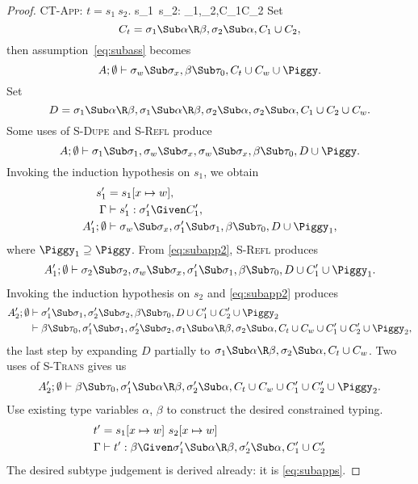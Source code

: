 \documentclass{amsart}
\theoremstyle{definition}
\begin{document}
\begin{proof}
\Case\textsc{CT-App}: $t=s_1~s_2$.
{\Gamma\vdash s_1~s_2:\beta\Given
\sigma_1\Sub\alpha\R\beta,\sigma_2\Sub\alpha,C_1\cup C_2
}
Set
\[
C_t=\sigma_1\Sub\alpha\R\beta,\sigma_2\Sub\alpha,C_1\cup C_2,
\]
then assumption~\eqref{eq:subass} becomes
\[
A;\Exigent\vdash
  \sigma_\Xdef\Sub\sigma_x,
  \beta\Sub\tau_0,
  C_t\cup C_\Xdef\cup\Piggy.
\]
Set
\[
D=
\sigma_1\Sub\alpha\R\beta,
\sigma_1\Sub\alpha\R\beta,
\sigma_2\Sub\alpha,
\sigma_2\Sub\alpha,C_1\cup C_2\cup C_\Xdef.
\]
Some uses of \textsc{S-Dupe} and \textsc{S-Refl} produce
\[
A;\Exigent\vdash
  \sigma_1\Sub\sigma_1,
  \sigma_\Xdef\Sub\sigma_x,\sigma_\Xdef\Sub\sigma_x,
  \beta\Sub\tau_0,
  D\cup\Piggy.
\]
Invoking the induction hypothesis on $s_1$, we obtain
\begin{align}
s_1'&=s_1[x\mapsto \Xdef]\notag,
\\
\Gamma&\vdash s_1' : \sigma_1' \Given C_1',
\label{eq:subapp1}
\\
A_1';\Exigent&\vdash
  \sigma_\Xdef\Sub\sigma_x,
  \sigma_1'\Sub\sigma_1,
  \beta\Sub\tau_0,
  D\cup\Piggy_1,
\label{eq:subapp2}
\end{align}
where $\Piggy_1\supseteq\Piggy$. From \eqref{eq:subapp2},
\textsc{S-Refl} produces
\begin{align}
A_1';\Exigent\vdash
  \sigma_2\Sub\sigma_2,
  \sigma_\Xdef\Sub\sigma_x,
  \sigma_1'\Sub\sigma_1,
  \beta\Sub\tau_0,
  D\cup C_1'\cup\Piggy_1.
\label{eq:subappf}
\end{align}
Invoking the induction hypothesis on $s_2$ and \eqref{eq:subapp2}
produces
\begin{align}
A_2';\Exigent&\vdash
  \sigma_1'\Sub\sigma_1,
  \sigma_2'\Sub\sigma_2,
  \beta\Sub\tau_0,
  D\cup C_1'\cup C_2'\cup\Piggy_2
\notag\\
&\vdash
  \beta\Sub\tau_0,
  \sigma_1'\Sub\sigma_1,
  \sigma_2'\Sub\sigma_2,
  \sigma_1\Sub\alpha\R\beta,\sigma_2\Sub\alpha,
  C_t\cup C_\Xdef\cup C_1'\cup C_2'\cup\Piggy_2,
\notag
\end{align}
the last step by expanding $D$ partially to
$\sigma_1\Sub\alpha\R\beta,\sigma_2\Sub\alpha,C_t\cup C_\Xdef$.
Two uses of \textsc{S-Trans} gives us
\begin{align}
A_2';\Exigent\vdash
  \beta\Sub\tau_0,
  \sigma_1'\Sub\alpha\R\beta,\sigma_2'\Sub\alpha,
  C_t\cup C_\Xdef\cup C_1'\cup C_2'\cup\Piggy_2.
\label{eq:subapps}
\end{align}
Use existing type variables $\alpha$, $\beta$ to construct the
desired constrained typing.
\begin{align}
t'&=s_1[x\mapsto \Xdef]~s_2[x\mapsto \Xdef]
\notag\\
\Gamma&\vdash t':
\beta\Given
\sigma_1'\Sub\alpha\R\beta,\sigma_2'\Sub\alpha,
C_1'\cup C_2'
\notag
\end{align}
The desired subtype judgement is derived already: it is
\eqref{eq:subapps}.


\end{proof}
\end{document}
